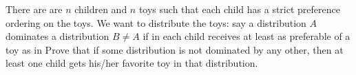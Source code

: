 There are are $n$ children and $n$ toys such that each child has a strict preference ordering on the toys. We want to distribute the toys: say a distribution $A$ dominates a distribution $ B \ne A $ if in  each child receives at least as preferable of a toy as in  Prove that if some distribution is not dominated by any other, then at least one child gets his/her favorite toy in that distribution.